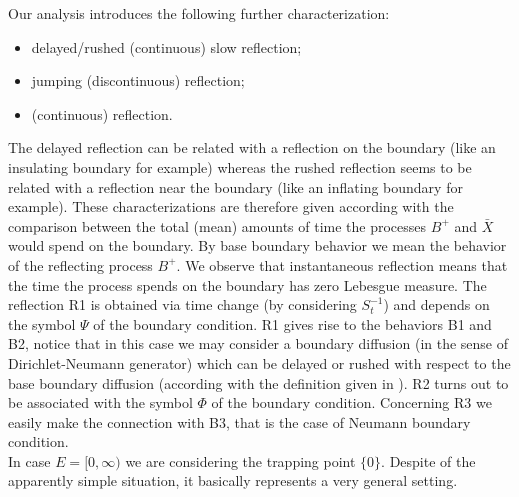 \documentclass[11pt,a4paper]{article}
\theoremstyle{plain}
\theoremstyle{definition}
\theoremstyle{remark}
\begin{document}
		Our analysis introduces the following further characterization: 
		\begin{itemize}  
			\item[R1)] delayed/rushed (continuous) slow reflection;
			\item[R2)] jumping (discontinuous) reflection;
			\item[R3)] (continuous) reflection.
		\end{itemize}
		The delayed reflection can be related with a reflection on the boundary (like an insulating boundary for example) whereas the rushed reflection seems to be related with a reflection near the boundary (like an inflating boundary for example). These characterizations are therefore given according with the comparison between the total (mean) amounts of time the processes $B^+$ and $\bar{X}$ would spend on the boundary. By base boundary behavior we mean the behavior of the reflecting process $B^+$. We observe that instantaneous reflection means that the time the process spends on the boundary has zero Lebesgue measure. The reflection R1 is obtained via time change (by considering $S^{-1}_t$) and depends on the symbol $\Psi$ of the boundary condition. R1 gives rise to the behaviors B1 and B2, notice that in this case we may consider a boundary diffusion (in the sense of Dirichlet-Neumann generator) which can be delayed or rushed with respect to the base boundary diffusion (according with the definition given in \cite{capitanelli2020delayed}). R2 turns out to be associated with the symbol $\Phi$ of the boundary condition. Concerning R3 we easily make the connection with B3, that is the case of Neumann boundary condition.\\
		
		In case $E=[0, \infty)$ we are considering the trapping point $\{0\}$. Despite of the apparently simple situation, it basically represents a very general setting.
		
		
		
\end{document}
